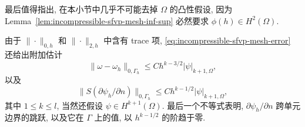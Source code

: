 最后值得指出, 在本小节中几乎不可能去掉 $\Omega$ 的凸性假设,
因为 Lemma~\ref{lem:incompressible-sfvp-mesh-inf-sup}
必然要求 $\phi(h)\in H^2(\Omega)$.

\begin{Remark}\label{rem:incompressible-sfvp-mesh-trace-errors}
由于 $\|\cdot\|_{0,h}$ 和 $\|\cdot\|_{2,h}$ 中含有 trace 项,
\eqref{eq:incompressible-sfvp-mesh-error} 还给出附加估计
\[
\|\omega-\omega_h\|_{0,\Gamma_h}
\leq Ch^{k-3/2}|\psi|_{k+1,\Omega},
\]
以及
\[
\|S(\partial\psi_h/\partial n)\|_{0,\Gamma_h}
\leq Ch^{k-1/2}|\psi|_{k+1,\Omega},
\]
其中 $1\leq k\leq l$, 当然还假设
$\psi\in H^{k+1}(\Omega)$.
最后一个不等式表明, $\partial\psi_h/\partial n$
跨单元边界的跳跃, 以及它在 $\Gamma$ 上的值,
以 $h^{k-1/2}$ 的阶趋于零.
\end{Remark}

